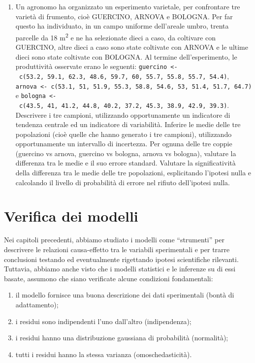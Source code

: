 \documentclass[
  12pt,
]{book}
\providecommand{\tightlist}{%
  \setlength{\itemsep}{0pt}\setlength{\parskip}{0pt}}
\begin{document}
\begin{enumerate}
\item
  Un agronomo ha organizzato un esperimento varietale, per confrontare tre varietà di frumento, cioè GUERCINO, ARNOVA e BOLOGNA. Per far questo ha individuato, in un campo uniforme dell'areale umbro, trenta parcelle da 18 m\textsuperscript{2} e ne ha selezionate dieci a caso, da coltivare con GUERCINO, altre dieci a caso sono state coltivate con ARNOVA e le ultime dieci sono state coltivate con BOLOGNA. Al termine dell'esperimento, le produttività osservate erano le seguenti: \texttt{guercino\ \textless{}-\ c(53.2,\ 59.1,\ 62.3,\ 48.6,\ 59.7,\ 60,\ 55.7,\ 55.8,\ 55.7,\ 54.4)}, \texttt{arnova\ \textless{}-\ c(53.1,\ 51,\ 51.9,\ 55.3,\ 58.8,\ 54.6,\ 53,\ 51.4,\ 51.7,\ 64.7)} e \texttt{bologna\ \textless{}-\ c(43.5,\ 41,\ 41.2,\ 44.8,\ 40.2,\ 37.2,\ 45.3,\ 38.9,\ 42.9,\ 39.3)}. Descrivere i tre campioni, utilizzando opportunamente un indicatore di tendenza centrale ed un indicatore di variabilità. Inferire le medie delle tre popolazioni (cioè quelle che hanno generato i tre campioni), utilizzando opportunamente un intervallo di incertezza. Per ognuna delle tre coppie (guercino vs arnova, guercino vs bologna, arnova vs bologna), valutare la differenza tra le medie e il suo errore standard. Valutare la significatività della differenza tra le medie delle tre popolazioni, esplicitando l'ipotesi nulla e calcolando il livello di probabilità di errore nel rifiuto dell'ipotesi nulla.
\end{enumerate}

\hypertarget{verifica-dei-modelli}{%
\chapter{Verifica dei modelli}\label{verifica-dei-modelli}}

Nei capitoli precedenti, abbiamo studiato i modelli come ``strumenti'' per descrivere le relazioni causa-effetto tra le variabili sperimentali e per trarre conclusioni testando ed eventualmente rigettando ipotesi scientifiche rilevanti. Tuttavia, abbiamo anche visto che i modelli statistici e le inferenze su di essi basate, assumono che siano verificate alcune condizioni fondamentali:

\begin{enumerate}
\def\labelenumi{\arabic{enumi}.}
\tightlist
\item
  il modello fornisce una buona descrizione dei dati sperimentali (bontà di adattamento);
\item
  i residui sono indipendenti l'uno dall'altro (indipendenza);
\item
  i residui hanno una distribuzione gaussiana di probabilità (normalità);
\item
  tutti i residui hanno la stessa varianza (omoschedasticità).
\end{enumerate}
\end{document}
